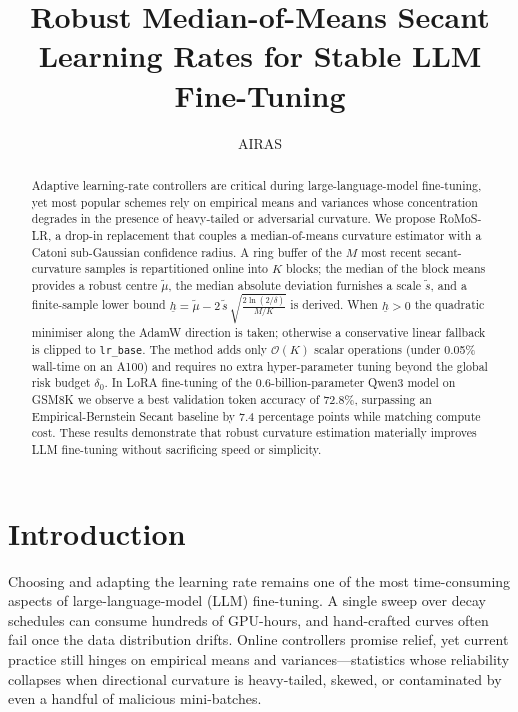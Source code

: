 \documentclass{article} %
\title{Robust Median-of-Means Secant Learning Rates for Stable LLM Fine-Tuning}
\author{AIRAS}
\begin{document}
\maketitle

\begin{abstract}
Adaptive learning-rate controllers are critical during large-language-model fine-tuning, yet most popular schemes rely on empirical means and variances whose concentration degrades in the presence of heavy-tailed or adversarial curvature. We propose RoMoS-LR, a drop-in replacement that couples a median-of-means curvature estimator with a Catoni sub-Gaussian confidence radius. A ring buffer of the \(M\) most recent secant-curvature samples is repartitioned online into \(K\) blocks; the median of the block means provides a robust centre \(\tilde{\mu}\), the median absolute deviation furnishes a scale \(\tilde{s}\), and a finite-sample lower bound \(\underline{h} = \tilde{\mu} - 2\,\tilde{s}\,\sqrt{\tfrac{2\ln(2/\delta)}{M/K}}\) is derived. When \(\underline{h} > 0\) the quadratic minimiser along the AdamW direction is taken; otherwise a conservative linear fallback is clipped to \texttt{lr\_base}. The method adds only \(\mathcal{O}(K)\) scalar operations (under 0.05\% wall-time on an A100) and requires no extra hyper-parameter tuning beyond the global risk budget \(\delta_{0}\). In LoRA fine-tuning of the 0.6-billion-parameter Qwen3 model on GSM8K we observe a best validation token accuracy of 72.8\%, surpassing an Empirical-Bernstein Secant baseline by 7.4 percentage points while matching compute cost. These results demonstrate that robust curvature estimation materially improves LLM fine-tuning without sacrificing speed or simplicity.
\end{abstract}

\section{Introduction}\label{sec:intro}
Choosing and adapting the learning rate remains one of the most time-consuming aspects of large-language-model (LLM) fine-tuning. A single sweep over decay schedules can consume hundreds of GPU-hours, and hand-crafted curves often fail once the data distribution drifts. Online controllers promise relief, yet current practice still hinges on empirical means and variances---statistics whose reliability collapses when directional curvature is heavy-tailed, skewed, or contaminated by even a handful of malicious mini-batches.
\end{document}
